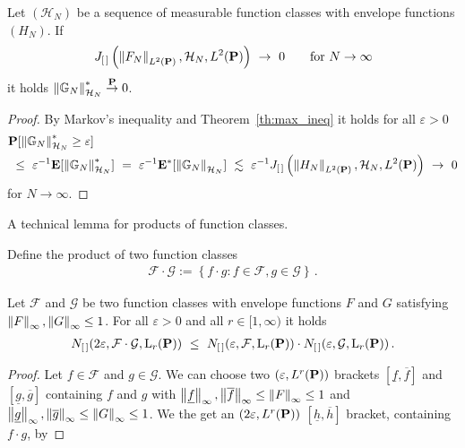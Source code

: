 \begin{lemma}
  \label{markov_max_lemma}
  Let $(\mathcal{H}_N)$ be a sequence of measurable function classes with envelope functions $(H_N)$.
  If
  \begin{gather}
    J_{[\, ]}
    \left( 
    \norm{F_N}_{ L^2(\P)}
    ,
    \mathcal{H}_N
    ,
     L^2(\P)
    \right)
    \ 
    \to
    \ 
    0
    \qquad
    \text{for}
    \ 
    N
    \to
    \infty
  \end{gather}
  it holds 
  $
  \norm{\G_N}^*_{\mathcal{H}_N}\overset{\P}{\to}0
  $.
\end{lemma}
\begin{proof}
  By Markov's inequality and Theorem~\ref{th:max_ineq} it holds for all $\varepsilon>0$
  \begin{align*}
    &
    \P
    [
  \norm{\G_N}^*_{\mathcal{H}_N}
  \ge
  \varepsilon
    ]
    \\
    &
    \ 
    \le
    \ 
    \varepsilon^{-1}
    \E
    [
  \norm{\G_N}^*_{\mathcal{H}_N}
    ]
    \ 
    =
    \ 
    \varepsilon^{-1}
    \E^*
    [
  \norm{\G_N}_{\mathcal{H}_N}
    ]
    \ 
    \lesssim
    \ 
    \varepsilon^{-1}
    J_{[\, ]}
    \left( 
    \norm{H_N}_{ L^2(\P)}
    ,
    \mathcal{H}_N
    ,
     L^2(\P)
    \right)
    \ 
    \to
    \ 
    0
  \end{align*}
  for $N\to\infty$. 
\end{proof}
A technical lemma for products of function classes.

Define the product of two function classes
\begin{gather*}
  \mathcal{F}\cdot \mathcal{G}
  :=
  \left\{ 
    f\cdot g
    \colon
    f\in\mathcal{F},
    g\in\mathcal{G}
  \right\}\,.
\end{gather*}
\begin{lemma}
  \label{lem_prod_br}
  Let
  $\mathcal{F}$ and $\mathcal{G}$ be two function classes 
  with envelope functions $F$ and $G$ satisfying
  $\norm{F}_\infty,\norm{G}_\infty\le 1$.
  For all $\varepsilon>0$ and all $r\in [1,\infty)$ it holds
  \begin{gather*}
    N_{[\,]}(2\varepsilon,\mathcal{F}\cdot\mathcal{G},\mathrm{L}_r(\P))
    \
    \le
    \ 
    N_{[\,]}(\varepsilon,\mathcal{F},\mathrm{L}_r(\P))
    \cdot
    N_{[\,]}(\varepsilon,\mathcal{G},\mathrm{L}_r(\P))
    \,.
  \end{gather*}
\end{lemma}
\begin{proof}
  Let $f\in\mathcal{F}$ and $g\in\mathcal{G}$.
  We can choose two 
  $(\varepsilon,L^r(\P))$
  brackets
  $[\underline{f},\overline{f}]$
  and
  $[\underline{g},\overline{g}]$
  containing $f$ and $g$ with 
  $\norm{\underline{f}}_\infty,\norm{\overline{f}}_\infty\le\norm{F}_\infty\le 1$
  and
  $\norm{\underline{g}}_\infty,\norm{\overline{g}}_\infty\le\norm{G}_\infty\le 1$.
  We the get an 
  $(2\varepsilon,L^r(\P))$
  $[\underline{h},\overline{h}]$
  bracket, containing $f\cdot g$, by
\end{proof}

